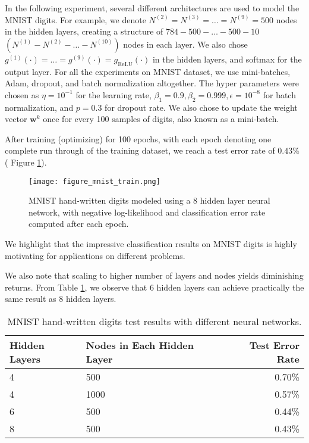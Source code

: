 In the following experiment, 
several different architectures 
are used to model the MNIST digits.
For example, 
we denote $N^{(2)} = N^{(3)} =\ldots =N^{(9)}= 500$ 
nodes in the hidden layers, 
creating a structure of $784-500-\ldots-500-10$
$\left( N^{(1)} - N^{(2)} - \ldots - N^{(10)} \right)$
nodes in each layer.
We also chose 
$g^{(1)}(\cdot) = \ldots = g^{(9)}(\cdot) = g_\text{ReLU}(\cdot)$ 
in the hidden layers,
and softmax for the output layer.
For all the experiments on MNIST dataset, 
we use mini-batches, Adam, dropout, and batch normalization
altogether.
The hyper parameters were chosen as $\eta = 10^{-1}$
for the learning rate,
$\beta_1 = 0.9, \beta_2 = 0.999, \epsilon = 10^{-8}$
for batch normalization,
and $p=0.3$ for dropout rate.
We also chose to update the weight vector $\mathbf{w}^k$ once
for every 100 samples of digits,
also known as a mini-batch.

After training (optimizing) for 100 epochs,
with each epoch denoting one complete run through 
of the training dataset,
we reach a test error rate of $0.43\%$ (
Figure \ref{fig:mnist_results}).
%
\begin{figure}[h]
\centering
\texttt{[image: figure\_mnist\_train.png]}
\caption{MNIST hand-written digits modeled using a 8 hidden
  layer neural network, with negative log-likelihood and
  classification error rate computed after each epoch.}
\label{fig:mnist_results}
\end{figure}
%
We highlight that the impressive classification 
results on MNIST digits is highly motivating
for applications on different problems.

We also note that scaling to higher number of layers
and nodes yields diminishing returns.
From Table \ref{tab:mnist_results},
we observe that 6 hidden layers can achieve 
practically the same result as 8 hidden layers.
%
\begin{table}[h]
\centering
\begin{tabular}{ | l | l | r | }
  \hline      
  Hidden Layers & 
  Nodes in Each Hidden Layer & Test Error Rate \\
  \hline
  4 & 500 & 0.70\% \\
  4 & 1000 & 0.57\% \\
  6 & 500 & 0.44\% \\
  8 & 500 & 0.43\% \\
  \hline  
\end{tabular}
\caption{MNIST hand-written digits test results 
    with different neural networks.}
\label{tab:mnist_results}
\end{table}

